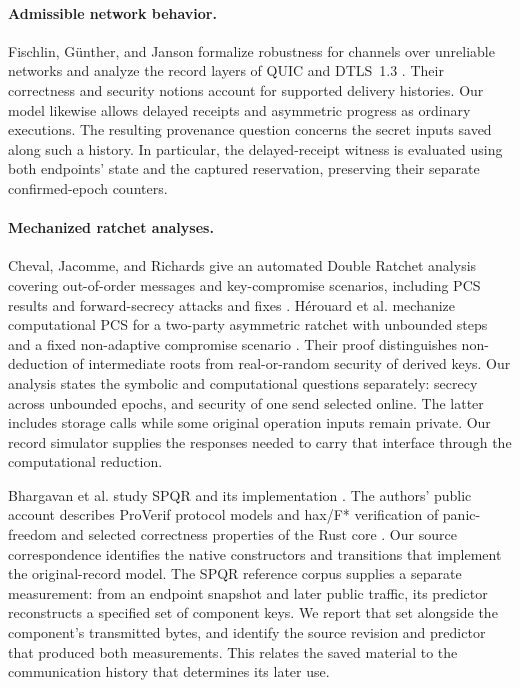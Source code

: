 \documentclass[pdflatex]{sn-jnl}
\theoremstyle{thmstyleone}
\theoremstyle{thmstylethree}
\theoremstyle{thmstyletwo}
\begin{document}
\paragraph{Admissible network behavior.}
Fischlin, G\"unther, and Janson formalize robustness for channels over unreliable
networks and analyze the record layers of QUIC and DTLS~1.3
\cite{robustchannels2024}. Their correctness and security notions account for
supported delivery histories. Our model likewise allows delayed receipts and
asymmetric progress as ordinary executions. The resulting provenance question
concerns the secret inputs saved along such a history. In particular, the
delayed-receipt witness is evaluated using both endpoints' state and the
captured reservation, preserving their separate confirmed-epoch counters.

\paragraph{Mechanized ratchet analyses.}
Cheval, Jacomme, and Richards give an automated Double Ratchet analysis covering
out-of-order messages and key-compromise scenarios, including PCS results and
forward-secrecy attacks and fixes \cite{doubleratchet2026}. H\'erouard et al.
mechanize computational PCS for a two-party asymmetric ratchet with unbounded
steps and a fixed non-adaptive compromise scenario \cite{squirrel2026}.
Their proof distinguishes non-deduction of intermediate roots from
real-or-random security of derived keys. Our analysis states the symbolic
and computational questions separately: secrecy across unbounded epochs,
and security of one send selected online. The latter includes storage
calls while some original operation inputs remain private. Our record
simulator supplies the responses needed to carry that interface through
the computational reduction.

Bhargavan et al. study SPQR and its implementation \cite{spqr2026}. The authors'
public account describes ProVerif protocol models and hax/F* verification of
panic-freedom and selected correctness properties of the Rust core
\cite{spqrverification2025}.
Our source correspondence identifies the native constructors and
transitions that implement the original-record model. The SPQR reference
corpus supplies a separate measurement: from an endpoint snapshot and
later public traffic, its predictor reconstructs a specified set of
component keys. We report that set alongside the component's transmitted
bytes, and identify the source revision and predictor that produced both
measurements. This relates the saved material to the communication history
that determines its later use.
\end{document}
